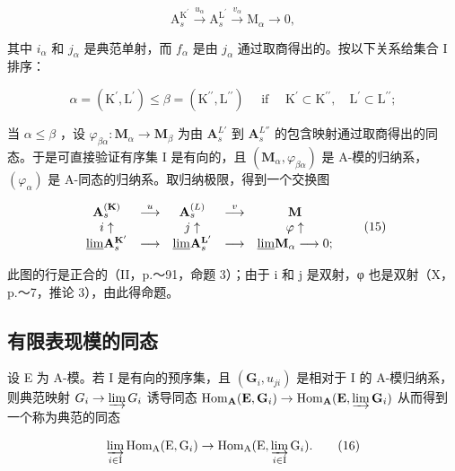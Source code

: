 \[
\mathrm{A} _ {s} ^ {\mathrm{K} ^ {\prime}} \xrightarrow {u _ {\alpha}} \mathrm{A} _ {s} ^ {\mathrm{L} ^ {\prime}} \xrightarrow {v _ {\alpha}} \mathrm{M} _ {\alpha} \longrightarrow 0,
\]

其中 \(i_{\alpha}\) 和 \(j_{\alpha}\) 是典范单射，而 \(f_{\alpha}\) 是由 \(j_{\alpha}\) 通过取商得出的。按以下关系给集合 I 排序：

\[
\alpha = \left(\mathrm{K} ^ {\prime}, \mathrm{L} ^ {\prime}\right) \leqslant \beta = \left(\mathrm{K} ^ {\prime \prime}, \mathrm{L} ^ {\prime \prime}\right) \quad \text { if } \quad \mathrm{K} ^ {\prime} \subset \mathrm{K} ^ {\prime \prime}, \quad \mathrm{L} ^ {\prime} \subset \mathrm{L} ^ {\prime \prime};
\]

当 \(\alpha \leqslant \beta\) ，设 \(\varphi_{\beta \alpha}: \mathbf{M}_{\alpha} \to \mathbf{M}_{\beta}\) 为由 \(\mathbf{A}_s^{L'}\) 到 \(\mathbf{A}_s^{L''}\) 的包含映射通过取商得出的同态。于是可直接验证有序集 I 是有向的，且 \((\mathbf{M}_{\alpha}, \varphi_{\beta \alpha})\) 是 A-模的归纳系， \((\varphi_{\alpha})\) 是 A-同态的归纳系。取归纳极限，得到一个交换图

\[
\begin{array}{c c c c c} \mathbf {A} _ {s} ^ {(\mathbf {K})} & \stackrel {{u}} {{\longrightarrow}} & \mathbf {A} _ {s} ^ {(L)} & \stackrel {{v}} {{\longrightarrow}} & \mathbf {M} \\ i \uparrow & & j \uparrow & & \varphi \uparrow \\ \underline {{\lim}} \mathbf {A} _ {s} ^ {\mathbf {K} ^ {\prime}} & \longrightarrow & \underline {{\lim}} \mathbf {A} _ {s} ^ {\mathbf {L} ^ {\prime}} & \longrightarrow & \underline {{\lim}} \mathbf {M} _ {\alpha} \longrightarrow 0; \end{array}\tag{15}
\]

此图的行是正合的（II，p.～91，命题 3）；由于 i 和 j 是双射，φ 也是双射（X，p.～7，推论 3），由此得命题。

\subsection{有限表现模的同态}

设 E 为 A-模。若 I 是有向的预序集，且 \((\mathbf{G}_{i}, u_{ji})\) 是相对于 I 的 A-模归纳系，则典范映射 \(G_{i} \to \varinjlim G_{i}\) 诱导同态 \(\operatorname{Hom}_{\mathbf{A}}(\mathbf{E}, \mathbf{G}_{i}) \to \operatorname{Hom}_{\mathbf{A}}(\mathbf{E}, \varinjlim \mathbf{G}_{i})\) 从而得到一个称为典范的同态

\[
\varinjlim_ {i \in \mathrm{I}} \operatorname{Hom} _ {\mathrm{A}} (\mathrm{E}, \mathrm{G} _ {i}) \rightarrow \operatorname{Hom} _ {\mathrm{A}} (\mathrm{E}, \varinjlim_ {i \in \mathrm{I}} \mathrm{G} _ {i}).\tag{16}
\]

